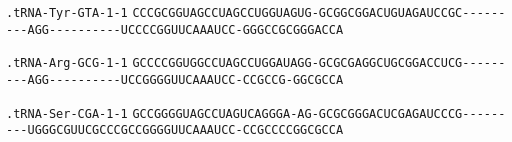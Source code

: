 \documentclass{article}
\newcommand{\rnabox}[1]{\colorbox{#1}{\texttt{#1}}}
\begin{document}
\texttt{.tRNA-Tyr-GTA-1-1}
\rnabox{C}\rnabox{C}\rnabox{C}\rnabox{G}\rnabox{C}\rnabox{G}\rnabox{G}\rnabox{U}\rnabox{A}\rnabox{G}\rnabox{C}\rnabox{C}\rnabox{U}\rnabox{A}\rnabox{G}\rnabox{C}\rnabox{C}\rnabox{U}\rnabox{G}\rnabox{G}\rnabox{U}\rnabox{A}\rnabox{G}\rnabox{U}\rnabox{G}\rnabox{-}\rnabox{G}\rnabox{C}\rnabox{G}\rnabox{G}\rnabox{C}\rnabox{G}\rnabox{G}\rnabox{A}\rnabox{C}\rnabox{U}\rnabox{G}\rnabox{U}\rnabox{A}\rnabox{G}\rnabox{A}\rnabox{U}\rnabox{C}\rnabox{C}\rnabox{G}\rnabox{C}\rnabox{-}\rnabox{-}\rnabox{-}\rnabox{-}\rnabox{-}\rnabox{-}\rnabox{-}\rnabox{-}\rnabox{-}\rnabox{A}\rnabox{G}\rnabox{G}\rnabox{-}\rnabox{-}\rnabox{-}\rnabox{-}\rnabox{-}\rnabox{-}\rnabox{-}\rnabox{-}\rnabox{-}\rnabox{-}\rnabox{U}\rnabox{C}\rnabox{C}\rnabox{C}\rnabox{C}\rnabox{G}\rnabox{G}\rnabox{U}\rnabox{U}\rnabox{C}\rnabox{A}\rnabox{A}\rnabox{A}\rnabox{U}\rnabox{C}\rnabox{C}\rnabox{-}\rnabox{G}\rnabox{G}\rnabox{G}\rnabox{C}\rnabox{C}\rnabox{G}\rnabox{C}\rnabox{G}\rnabox{G}\rnabox{G}\rnabox{A}\rnabox{C}\rnabox{C}\rnabox{A}

\vspace{-0.5mm}

\texttt{.tRNA-Arg-GCG-1-1}
\rnabox{G}\rnabox{C}\rnabox{C}\rnabox{C}\rnabox{C}\rnabox{G}\rnabox{G}\rnabox{U}\rnabox{G}\rnabox{G}\rnabox{C}\rnabox{C}\rnabox{U}\rnabox{A}\rnabox{G}\rnabox{C}\rnabox{C}\rnabox{U}\rnabox{G}\rnabox{G}\rnabox{A}\rnabox{U}\rnabox{A}\rnabox{G}\rnabox{G}\rnabox{-}\rnabox{G}\rnabox{C}\rnabox{G}\rnabox{C}\rnabox{G}\rnabox{A}\rnabox{G}\rnabox{G}\rnabox{C}\rnabox{U}\rnabox{G}\rnabox{C}\rnabox{G}\rnabox{G}\rnabox{A}\rnabox{C}\rnabox{C}\rnabox{U}\rnabox{C}\rnabox{G}\rnabox{-}\rnabox{-}\rnabox{-}\rnabox{-}\rnabox{-}\rnabox{-}\rnabox{-}\rnabox{-}\rnabox{-}\rnabox{A}\rnabox{G}\rnabox{G}\rnabox{-}\rnabox{-}\rnabox{-}\rnabox{-}\rnabox{-}\rnabox{-}\rnabox{-}\rnabox{-}\rnabox{-}\rnabox{-}\rnabox{U}\rnabox{C}\rnabox{C}\rnabox{G}\rnabox{G}\rnabox{G}\rnabox{G}\rnabox{U}\rnabox{U}\rnabox{C}\rnabox{A}\rnabox{A}\rnabox{A}\rnabox{U}\rnabox{C}\rnabox{C}\rnabox{-}\rnabox{C}\rnabox{C}\rnabox{G}\rnabox{C}\rnabox{C}\rnabox{G}\rnabox{-}\rnabox{G}\rnabox{G}\rnabox{C}\rnabox{G}\rnabox{C}\rnabox{C}\rnabox{A}

\vspace{-0.5mm}

\texttt{.tRNA-Ser-CGA-1-1}
\rnabox{G}\rnabox{C}\rnabox{C}\rnabox{G}\rnabox{G}\rnabox{G}\rnabox{G}\rnabox{U}\rnabox{A}\rnabox{G}\rnabox{C}\rnabox{C}\rnabox{U}\rnabox{A}\rnabox{G}\rnabox{U}\rnabox{C}\rnabox{A}\rnabox{G}\rnabox{G}\rnabox{G}\rnabox{A}\rnabox{-}\rnabox{A}\rnabox{G}\rnabox{-}\rnabox{G}\rnabox{C}\rnabox{G}\rnabox{C}\rnabox{G}\rnabox{G}\rnabox{G}\rnabox{A}\rnabox{C}\rnabox{U}\rnabox{C}\rnabox{G}\rnabox{A}\rnabox{G}\rnabox{A}\rnabox{U}\rnabox{C}\rnabox{C}\rnabox{C}\rnabox{G}\rnabox{-}\rnabox{-}\rnabox{-}\rnabox{-}\rnabox{-}\rnabox{-}\rnabox{-}\rnabox{-}\rnabox{-}\rnabox{U}\rnabox{G}\rnabox{G}\rnabox{G}\rnabox{C}\rnabox{G}\rnabox{U}\rnabox{U}\rnabox{C}\rnabox{G}\rnabox{C}\rnabox{C}\rnabox{C}\rnabox{G}\rnabox{C}\rnabox{C}\rnabox{G}\rnabox{G}\rnabox{G}\rnabox{G}\rnabox{U}\rnabox{U}\rnabox{C}\rnabox{A}\rnabox{A}\rnabox{A}\rnabox{U}\rnabox{C}\rnabox{C}\rnabox{-}\rnabox{C}\rnabox{C}\rnabox{G}\rnabox{C}\rnabox{C}\rnabox{C}\rnabox{C}\rnabox{G}\rnabox{G}\rnabox{C}\rnabox{G}\rnabox{C}\rnabox{C}\rnabox{A}
\end{document}
